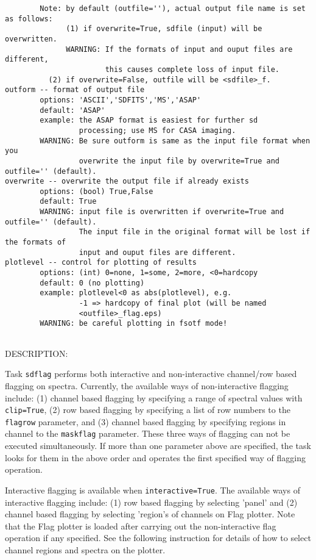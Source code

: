 \begin{verbatim}
        Note: by default (outfile=''), actual output file name is set as follows: 
              (1) if overwrite=True, sdfile (input) will be overwritten. 
              WARNING: If the formats of input and ouput files are different, 
                       this causes complete loss of input file.
	      (2) if overwrite=False, outfile will be <sdfile>_f. 
outform -- format of output file
        options: 'ASCII','SDFITS','MS','ASAP'
        default: 'ASAP'
        example: the ASAP format is easiest for further sd
                 processing; use MS for CASA imaging.
        WARNING: Be sure outform is same as the input file format when you 
                 overwrite the input file by overwrite=True and outfile='' (default).
overwrite -- overwrite the output file if already exists
        options: (bool) True,False
        default: True
        WARNING: input file is overwritten if overwrite=True and outfile='' (default). 
                 The input file in the original format will be lost if the formats of
                 input and ouput files are different.
plotlevel -- control for plotting of results
        options: (int) 0=none, 1=some, 2=more, <0=hardcopy
        default: 0 (no plotting)
        example: plotlevel<0 as abs(plotlevel), e.g.
                 -1 => hardcopy of final plot (will be named
                 <outfile>_flag.eps)
        WARNING: be careful plotting in fsotf mode!


\end{verbatim}


    DESCRIPTION:

        Task {\tt sdflag} performs both interactive and non-interactive channel/row 
        based flagging on spectra.
        Currently, the available ways of non-interactive flagging include: 
        (1) channel based flagging by specifying a range of spectral values 
        with {\tt clip=True}, (2) row based flagging by specifying a list of row 
        numbers to the {\tt flagrow} parameter, and (3) channel based flagging by 
        specifying regions in channel to the {\tt maskflag} parameter. 
        These three ways of flagging can not be executed simultaneously. 
        If more than one parameter above are specified, the task looks for 
        them in the above order and operates the first specified way of 
        flagging operation.

        Interactive flagging is available when {\tt interactive=True}. 
        The available ways of interactive flagging include: 
        (1) row based flagging by selecting 'panel' and (2) channel
        based flagging by selecting 'region's of channels on Flag plotter. 
        Note that the Flag plotter is loaded after carrying out the 
        non-interactive flag operation if any specified. See the following instruction for
        details of how to select channel regions and spectra on the plotter.

